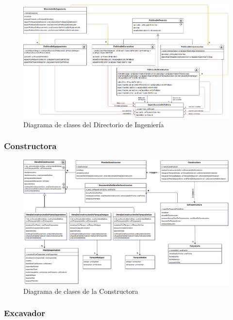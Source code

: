 \documentclass[10pt,a3paper, ,landscape]{article}
\begin{document}
\begin{figure}[H]
\centerline{\includegraphics[scale=0.75]{images/DiagramaDeClases_deDirectorioDeIngenieria.png}}
\caption{Diagrama de clases del Directorio de Ingeniería}
\end{figure}

\subsubsection{Constructora}

\begin{figure}[H]
\centerline{\includegraphics[scale=0.7]{images/DiagramaDeClases_deConstructora.png}}
\caption{Diagrama de clases de la Constructora}
\end{figure}

\subsubsection{Excavador}
\end{document}
